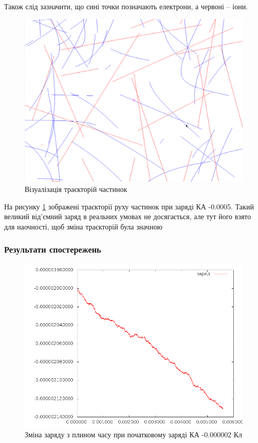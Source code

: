 \documentclass[a4paper,12pt]{article}
\begin{document}
Також слід зазначити, що сині точки позначають електрони, а червоні -- іони.

\begin{figure}[!htp]
\centering
\includegraphics[scale=0.50]{screens/traject.png}
\caption{Візуалізація траєкторій частинок}
\label{fig:f5}
\end{figure}

На рисунку \ref{fig:f5} зображені траєкторії руху частинок при заряді КА -0.0005. Такий великий від’ємний заряд в реальних умовах не досягається, але тут його взято для наочності, щоб зміна траєкторій була значною

\subsubsection{Результати спостережень}
\begin{figure}[!htp]
\centering
\includegraphics[scale=0.50]{screens/000002_txt.png}
\caption{Зміна заряду з плином часу при початковому заряді КА -0.000002 Кл}
\end{figure}
\end{document}

